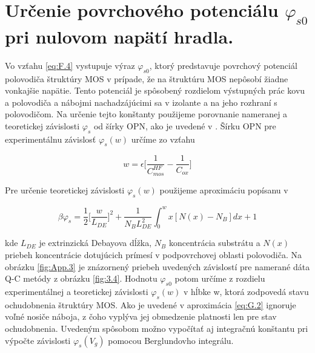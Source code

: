 
\chapter{Určenie povrchového potenciálu $\varphi_{s0}$ pri nulovom napätí hradla.} %

\label{app:AppendixG} %


Vo vzťahu \ref{eq:F.4} vystupuje výraz $\varphi_{s0}$, ktorý
predstavuje povrchový potenciál polovodiča štruktúry MOS v prípade, že
na štruktúru MOS nepôsobí žiadne vonkajšie napätie.  Tento potenciál
je spôsobený rozdielom výstupných prác kovu a polovodiča a nábojmi
nachadzájúcimi sa v izolante a na jeho rozhraní s polovodičom. Na
určenie tejto konštanty použijeme porovnanie nameranej a teoretickej
závislosti $\varphi_{s}$ od šírky OPN, ako je uvedené v
\cite{App.3}. Šírku OPN pre experimentálnu závislosť $\varphi_{s}(w)$
určíme zo vzťahu

\begin{equation}\label{eq:G.1}
w = \epsilon \Bigg[\frac{1}{C_{mos}^{HF}} - \frac{1}{C_{ox}}\Bigg]
\end{equation}

Pre určenie teoretickej závislosti $\varphi_{s}(w)$ použijeme
aproximáciu popísanu v \cite{App.5}

\begin{equation}\label{eq:G.2}
\beta \varphi_{s} = \frac{1}{2} \Big[\frac{w}{L_{DE}}\Big]^2 + \frac{1}{N_{B}L_{DE}^{2}} \int_{0}^{w}x[N(x)-N_{B}]dx + 1
\end{equation}

kde $L_{DE}$ je extrinzická Debayova dĺžka, $N_{B}$ koncentrácia
substrátu a $N(x)$ priebeh koncentrácie dotujúcich prímesí v
podpovrchovej oblasti polovodiča. Na obrázku \ref{fig:App.3} je
znázornený priebeh uvedených závislostí pre namerané dáta Q-C metódy z
obrázku \ref{fig:3.4}. Hodnotu $\varphi_{s0}$ potom určíme z rozdielu
experimentálnej a teoretickej závislosti $\varphi_{s}(w)$ v hĺbke w,
ktorá zodpovedá stavu ochudobnenia štruktúry MOS. Ako je uvedené v
\cite{App.3} aproximácia \ref{eq:G.2} ignoruje voľné nosiče náboja, z
čoho vyplýva jej obmedzenie platnosti len pre stav ochudobnenia.
Uvedeným spôsobom možno vypočítať aj integračnú konštantu pri výpočte
závislosti $\varphi_{s}(V_{g})$ pomocou Berglundovho integrálu.

